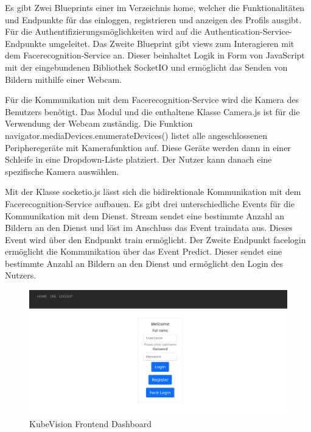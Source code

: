 Es gibt Zwei Blueprints einer im Verzeichnis home, welcher die Funktionalitäten und Endpunkte für das einloggen, registrieren und anzeigen des Profils ausgibt.
Für die Authentifizierungsmöglichkeiten wird auf die Authentication-Service-Endpunkte umgeleitet.
Das Zweite Blueprint gibt views zum Interagieren mit dem Facerecognition-Service an.
Dieser beinhaltet Logik in Form von JavaScript mit der eingebundenen Bibliothek SocketIO und ermöglicht das Senden von Bildern mithilfe einer Webcam.

Für die Kommunikation mit dem Facerecognition-Service wird die Kamera des Benutzers benötigt.
Das Modul und die enthaltene Klasse Camera.js ist für die Verwendung der Webcam zuständig.
Die Funktion navigator.mediaDevices.enumerateDevices() listet alle angeschlossenen Peripheregeräte mit Kamerafunktion auf.
Diese Geräte werden dann in einer Schleife in eine Dropdown-Liste platziert.
Der Nutzer kann danach eine spezifische Kamera auswählen.

Mit der Klasse socketio.js lässt sich die bidirektionale Kommunikation mit dem Facerecognition-Service aufbauen.
Es gibt drei unterschiedliche Events für die Kommunikation mit dem Dienst.
Stream sendet eine bestimmte Anzahl an Bildern an den Dienst und löst im Anschluss das Event traindata aus.
Dieses Event wird über den Endpunkt train ermöglicht.
Der Zweite Endpunkt facelogin ermöglicht die Kommunikation über das Event Predict.
Dieser sendet eine bestimmte Anzahl an Bildern an den Dienst und ermöglicht den Login des Nutzers.

\begin{figure}[!htb]
  \centering
  \includegraphics[width=1.0\columnwidth]{images/kubevision_home.png}
  \caption{KubeVision Frontend Dashboard}
  \label{fig:kubevision_home}
\end{figure}


